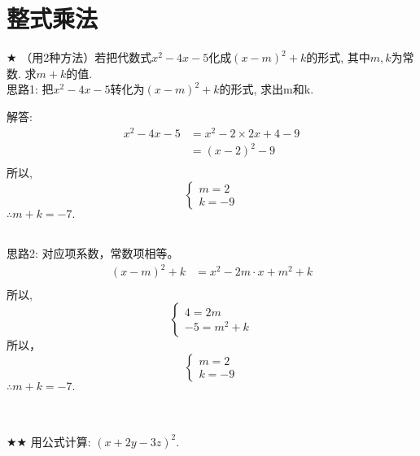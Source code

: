 \section{整式乘法}

\item {
    $\bigstar$
    （用2种方法）若把代数式$x^2-4x-5$化成$(x-m)^2+k$的形式, 其中$m, k$为常数. 求$m+k$的值. 
    \ifshowSolution
        \fangsong{}
        \\
        思路1: 把$x^2-4x-5$转化为$(x-m)^2+k$的形式, 求出m和k. 

        解答: 
        \begin{align*}
            x^2-4x-5 &= x^2 - 2\times 2x + 4 - 9 \\
            &= (x-2)^2 - 9 \\
        \end{align*}
        所以, 
        \[\left\{ 
            \begin{array}{lc}
                m = 2\\
                k =-9
            \end{array}
        \right. \]
        $\therefore m+k=-7. $
        \\
        \\
        思路2: 对应项系数，常数项相等。
        \begin{align*}
            (x-m)^2+k &= x^2 - 2m\cdot x + m^2 + k \\
        \end{align*}
        所以, 
        \[\left\{ 
            \begin{array}{lc}
                4 = 2m\\
                -5 = m^2 + k
            \end{array}
        \right. \]
        所以，
        \[\left\{ 
            \begin{array}{lc}
                m = 2\\
                k =-9
            \end{array}
        \right. \]
        $\therefore m+k=-7. $
    \else
        \\ \\ \\
    \fi
}

\item {
    $\bigstar \bigstar$
    用公式计算: $(x+2y-3z)^2$. 
    \\ \\ \\
}

